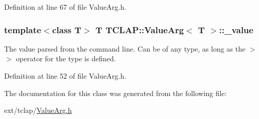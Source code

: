 Definition at line 67 of file Value\+Arg.\+h.

\hypertarget{class_t_c_l_a_p_1_1_value_arg_a45d5fdfce5865c02e6663f7438d485c7}{}
\subsubsection[{\+\_\+value}]{\setlength{\rightskip}{0pt plus 5cm}template$<$class T$>$ T {\bf T\+C\+L\+A\+P\+::\+Value\+Arg}$<$ T $>$\+::\+\_\+value\hspace{0.3cm}{\ttfamily [protected]}}\label{class_t_c_l_a_p_1_1_value_arg_a45d5fdfce5865c02e6663f7438d485c7}
The value parsed from the command line. Can be of any type, as long as the $>$$>$ operator for the type is defined. 

Definition at line 52 of file Value\+Arg.\+h.



The documentation for this class was generated from the following file\+:\begin{DoxyCompactItemize}
\item 
ext/tclap/\hyperlink{_value_arg_8h}{Value\+Arg.\+h}\end{DoxyCompactItemize}
